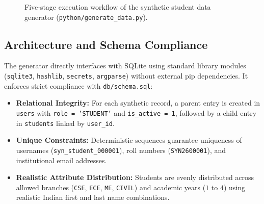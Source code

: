 \begin{figure}[H]
\centering
{}
\caption{Five-stage execution workflow of the synthetic student data generator (\texttt{python/generate\_data.py}).}
\label{fig:generator-workflow}
\end{figure}

\subsection{Architecture and Schema Compliance}
The generator directly interfaces with SQLite using standard library modules (\texttt{sqlite3}, \texttt{hashlib}, \texttt{secrets}, \texttt{argparse}) without external pip dependencies. It enforces strict compliance with \texttt{db/schema.sql}:
\begin{itemize}
    \item \textbf{Relational Integrity:} For each synthetic record, a parent entry is created in \texttt{users} with \texttt{role = 'STUDENT'} and \texttt{is\_active = 1}, followed by a child entry in \texttt{students} linked by \texttt{user\_id}.
    \item \textbf{Unique Constraints:} Deterministic sequences guarantee uniqueness of usernames (\texttt{syn\_student\_000001}), roll numbers (\texttt{SYN2600001}), and institutional email addresses.
    \item \textbf{Realistic Attribute Distribution:} Students are evenly distributed across allowed branches (\texttt{CSE}, \texttt{ECE}, \texttt{ME}, \texttt{CIVIL}) and academic years ($1$ to $4$) using realistic Indian first and last name combinations.
\end{itemize}

